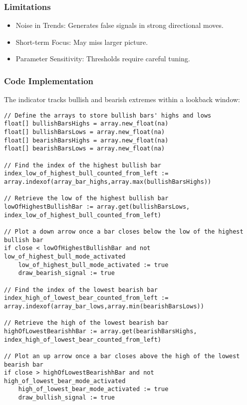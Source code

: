 \documentclass[12pt]{article}
\begin{document}
\subsubsection{Limitations}
\begin{itemize}
\item Noise in Trends: Generates false signals in strong directional moves.
\item Short-term Focus: May miss larger picture.
\item Parameter Sensitivity: Thresholds require careful tuning.
\end{itemize}

\subsubsection{Code Implementation}
The indicator tracks bullish and bearish extremes within a lookback window:

\begin{lstlisting}[language=Pine, caption=Pine Script Code for Flip Flop Indicator]
// Define the arrays to store bullish bars' highs and lows
float[] bullishBarsHighs = array.new_float(na)
float[] bullishBarsLows = array.new_float(na)
float[] bearishBarsHighs = array.new_float(na)
float[] bearishBarsLows = array.new_float(na)

// Find the index of the highest bullish bar
index_low_of_highest_bull_counted_from_left := array.indexof(array_bar_highs,array.max(bullishBarsHighs))

// Retrieve the low of the highest bullish bar
lowOfHighestBullishBar := array.get(bullishBarsLows, index_low_of_highest_bull_counted_from_left)

// Plot a down arrow once a bar closes below the low of the highest bullish bar
if close < lowOfHighestBullishBar and not low_of_highest_bull_mode_activated
    low_of_highest_bull_mode_activated := true
    draw_bearish_signal := true

// Find the index of the lowest bearish bar
index_high_of_lowest_bear_counted_from_left := array.indexof(array_bar_lows,array.min(bearishBarsLows))

// Retrieve the high of the lowest bearish bar
highOfLowestBearishhBar := array.get(bearishBarsHighs, index_high_of_lowest_bear_counted_from_left)

// Plot an up arrow once a bar closes above the high of the lowest bearish bar
if close > highOfLowestBearishhBar and not high_of_lowest_bear_mode_activated
    high_of_lowest_bear_mode_activated := true
    draw_bullish_signal := true
\end{lstlisting}
\end{document}
